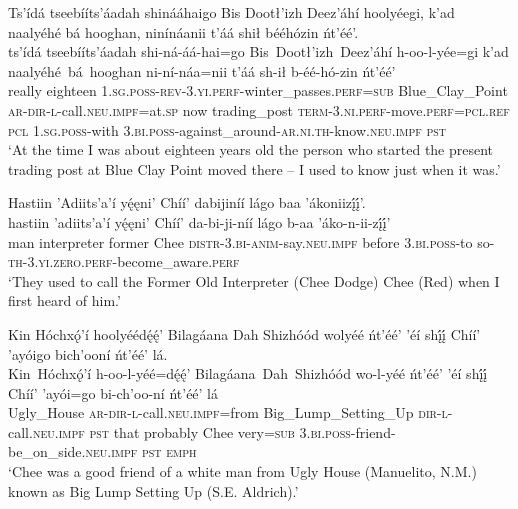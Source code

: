 \ea\label{ex:text1-9-1}
Ts’ídá tseebííts’áadah shinááhaigo Bis Dootł’izh Deez’áhí hoolyéegi, k’ad naalyéhé bá hooghan, ninínáanii t’áá shił bééhózin ńt’éé’.\\
\gll ts’ídá	tseebííts’áadah	shi-ná-áá-hai=go	Bis~Dootł’izh~{Deez’áhí}	h-oo-l-yée=gi	k’ad	naalyéhé~bá~{hooghan}	ni-ní-náa=nii	t’áá	sh-ił	b-éé-hó-zin	ńt’éé’\\
     really	eighteen	1.\textsc{sg}.\textsc{poss}-\textsc{rev}-3.\textsc{yi}.\textsc{perf}-winter\_passes.\textsc{perf}=\textsc{sub}	Blue\_Clay\_Point	\textsc{ar}-\textsc{dir}-\textsc{l}-call.\textsc{neu}.\textsc{impf}=at.\textsc{sp}	now	trading\_post	\textsc{term}-3.\textsc{ni}.\textsc{perf}-move.\textsc{perf}=\textsc{pcl}.\textsc{ref}	\textsc{pcl}	1.\textsc{sg}.\textsc{poss}-with	3.\textsc{bi}.\textsc{poss}-against\_around-\textsc{ar}.\textsc{ni}.\textsc{th}-know.\textsc{neu}.\textsc{impf}	\textsc{pst}\\
\glt `At the time I was about eighteen years old the person who started the present trading post at Blue Clay Point moved there -- I used to know just when it was.'
\z

\ea\label{ex:text1-9-2}
Hastiin ’Adiits’a’í yę́ęni’ Chíí’ dabijiníí lágo baa ’ákoniizį́į́’.\\
\gll hastiin	’adiits’a’í	yę́ęni’	Chíí’	da-bi-ji-níí	lágo	b-aa	’áko-n-ii-zį́į́’\\
     man	interpreter	former	Chee	\textsc{distr}-3.\textsc{bi}-\textsc{anim}-say.\textsc{neu}.\textsc{impf}	before	3.\textsc{bi}.\textsc{poss}-to	so-\textsc{th}-3.\textsc{yi}.\textsc{zero}.\textsc{perf}-become\_aware.\textsc{perf}\\
\glt `They used to call the Former Old Interpreter (Chee Dodge) Chee (Red) when I first heard of him.'
\z

\ea\label{ex:text1-9-3}
Kin Hóchxǫ́’í hoolyéédę́ę́’ Bilagáana Dah Shizhóód wolyéé ńt’éé’ ’éí shį́į́ Chíí’ ’ayóigo bich’ooní ńt’éé’ lá.\\
\gll Kin~Hóchxǫ́’í	h-oo-l-yéé=dę́ę́’    Bilagáana~Dah~{Shizhóód}	wo-l-yéé	ńt’éé’	’éí	shį́į́	Chíí’	’ayói=go	bi-ch’oo-ní	ńt’éé’	lá\\
     Ugly\_House	\textsc{ar}-\textsc{dir}-\textsc{l}-call.\textsc{neu}.\textsc{impf}=from	Big\_Lump\_Setting\_Up	\textsc{dir}-\textsc{l}-call.\textsc{neu}.\textsc{impf}	\textsc{pst}	that	probably	Chee	very=\textsc{sub}	3.\textsc{bi}.\textsc{poss}-friend-be\_on\_side.\textsc{neu}.\textsc{impf}	\textsc{pst}	\textsc{emph}\\
\glt `Chee was a good friend of a white man from Ugly House (Manuelito, N.M.) known as Big Lump Setting Up (S.E. Aldrich).'
\z

